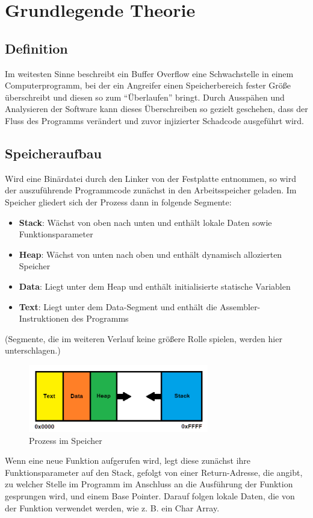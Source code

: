 \section{Grundlegende Theorie}
\subsection{Definition}
Im weitesten Sinne beschreibt ein Buffer Overflow eine Schwachstelle in einem Computerprogramm,
bei der ein Angreifer einen Speicherbereich fester Größe überschreibt und diesen so zum “Überlaufen” bringt.
Durch Ausspähen und Analysieren der Software kann dieses Überschreiben so gezielt geschehen, dass der Fluss des
Programms verändert und zuvor injizierter Schadcode ausgeführt wird.
\subsection{Speicheraufbau}
Wird eine Binärdatei durch den Linker von der Festplatte entnommen, so wird der auszuführende Programmcode
zunächst in den Arbeitsspeicher geladen. Im Speicher gliedert sich der Prozess dann in folgende Segmente:
\begin{itemize}
    \item \textbf{Stack}: Wächst von oben nach unten und enthält lokale Daten sowie Funktionsparameter
    \item \textbf{Heap}: Wächst von unten nach oben und enthält dynamisch allozierten Speicher
    \item \textbf{Data}: Liegt unter dem Heap und enthält initialisierte statische Variablen
    \item \textbf{Text}: Liegt unter dem Data-Segment und enthält die Assembler-Instruktionen des Programms
\end{itemize}

(Segmente, die im weiteren Verlauf keine größere Rolle spielen, werden hier unterschlagen.)
\begin{figure}[h]
    \centering
    \includegraphics[width=0.7\textwidth,height=0.75\textheight,keepaspectratio]{images/process.png}
    \caption{Prozess im Speicher}
\end{figure}
Wenn eine neue Funktion aufgerufen wird, legt diese zunächst ihre Funktionsparameter auf den Stack,
gefolgt von einer Return-Adresse, die angibt, zu welcher Stelle im Programm im Anschluss an die
Ausführung der Funktion gesprungen wird, und einem Base Pointer. Darauf folgen lokale Daten,
die von der Funktion verwendet werden, wie z. B. ein Char Array.
\pagebreak
